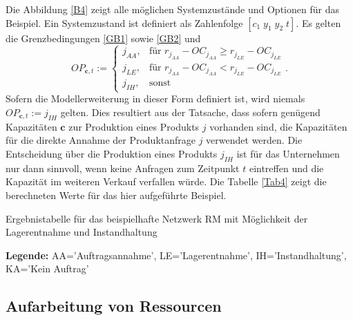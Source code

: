 Die Abbildung \ref{B4} zeigt alle möglichen Systemzustände und Optionen für das Beispiel. Ein Systemzustand ist definiert als Zahlenfolge $[c_{1}\; y_{1}\; y_{2}\;t]$. Es gelten die Grenzbedingungen \eqref{GB1} sowie \eqref{GB2} und
\begin{equation}\label{GB4}
     OP_{\textbf{c}, t}:=\left\{\begin{array}{lll} j_{AA}, & \text{für } r_{j_{AA}} - OC_{j_{AA}} \ge r_{j_{LE}} - OC_{j_{LE}}\\
         j_{LE}, & \text{für } r_{j_{AA}} - OC_{j_{AA}} < r_{j_{LE}} - OC_{j_{LE}}\\
         j_{IH}, & \text{sonst}\end{array}\right. .
\end{equation}
Sofern die Modellerweiterung in dieser Form definiert ist, wird niemals $OP_{\textbf{c}, t}:=j_{IH}$ gelten. Dies resultiert aus der Tatsache, dass sofern genügend Kapazitäten $\textbf{c}$ zur Produktion eines Produkts $j$ vorhanden sind, die Kapazitäten für die direkte Annahme der Produktanfrage $j$ verwendet werden. Die Entscheidung über die Produktion eines Produkts $j_{IH}$ ist für das Unternehmen nur dann sinnvoll, wenn keine Anfragen zum Zeitpunkt $t$ eintreffen und die Kapazität im weiteren Verkauf verfallen würde. Die Tabelle \ref{Tab4} zeigt die berechneten Werte für das hier aufgeführte Beispiel.
\begin{table}
\begin{footnotesize}
    \caption{Ergebnistabelle für das beispielhafte Netzwerk RM mit Möglichkeit der Lagerentnahme und Instandhaltung} \label{Tab4}
    \vspace*{3mm}
    \begin{center}
      \end{center}
    \begin{center}
      {\footnotesize \textbf{Legende:} AA='Auftragsannahme', LE='Lagerentnahme', IH='Instandhaltung', KA='Kein Auftrag'} 
      \end{center}
\end{footnotesize}
\end{table}

\subsection{Aufarbeitung von Ressourcen}

